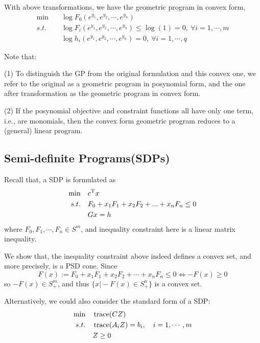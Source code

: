 With above transformations, we have the geometric program in convex form, 
\begin{align*}
\min\quad & \log F_0(e^{y_1},e^{y_2},\cdots,e^{y_n}) \\
s.t. \quad& \log F_i(e^{y_1},e^{y_2},\cdots,e^{y_n}) \leq \log(1) = 0,\ \forall i=1,\cdots,m\\
&\log h_i(e^{y_1},e^{y_2},\cdots,e^{y_n}) = 0,\ \forall i=1,\cdots,q
\end{align*}

Note that:

(1) To distinguish the GP from the original formulation and this convex one, we refer to the original as a geometric program in posynomial form, and the one after transformation as the geometric program in convex form.

(2) If the posynomial objective and constraint functions all have only one term, i.e., are monomials, then the convex form geometric program reduces to a (general) linear program.


\vspace{0.5cm}
\subsection{Semi-definite Programs(SDPs)}
Recall that, a SDP is formulated as 
\begin{align*}
\min \quad&c^{{\rm T}}x \\
s.t. \quad&F_0 + x_1F_1 + x_2F_2 + ... + x_nF_n \leq 0\\
&Gx = h
\end{align*}
where $F_0, F_1, \cdots, F_n \in S^m$, and inequality constraint here is a linear matrix inequality.

We show that, the inequality constraint above indeed defines a convex set, and more precisely, is a PSD cone. Since
\begin{equation*}
F(x) := F_0 + x_1F_1 + x_2F_2 + \cdots + x_nF_n  \leq 0 \Leftrightarrow -F(x) \geq 0
\end{equation*}
so $ -F(x) \in S_+^m$, and thus $\{x\vert -F(x)\in S^n_+ \}$ is a convex set. 

Alternatively, we could also consider the standard form of a SDP:
\begin{align*}
\min \quad&\operatorname{trace}(CZ) \\
s.t. \quad&\operatorname{trace}(A_iZ) = b_i, \quad i = 1, \cdots, m\\
&Z\geq 0
\end{align*}


